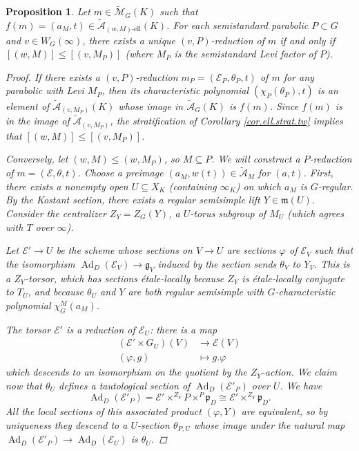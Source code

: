 \documentclass[openany]{amsbook}
\newtheorem{proposition}[theorem]{Proposition}
\theoremstyle{definition}
\theoremstyle{remark}
\numberwithin{equation}{section}
\newcommand{\cA}{\mathcal{A}}
\newcommand{\cM}{\mathcal{M}}
\newcommand{\cE}{\mathcal{E}}
\renewcommand{\phi}{\varphi}
\renewcommand{\-}{\operatorname{-}}
\newcommand{\on}[1]{\operatorname{#1}}
\newcommand{\fm}{\mathfrak{m}}
\newcommand{\el}{\text{-ell}}
\newcommand{\ctM}{\widetilde{\cM}}
\newcommand{\ctA}{\widetilde{\cA}}
\newcommand{\ctAt}[2]{\ctA_{(#1,#2)}}
\newcommand{\ctAe}[2]{\ctA_{(#1, #2)\el}}
\newcommand{\fp}{\mathfrak{p}}
\renewcommand{\fm}{\mathfrak{m}}
\renewcommand{\fg}{\mathfrak{g}}
\begin{document}
\begin{proposition}\label{prop.base.detects.p.reds}
    Let $m \in \ctM_G(K)$ such that $f(m) = (a_M, t) \in \ctAe{w}{M}(K)$. For each semistandard parabolic $P \subset G$ and $v \in W_G(\infty)$, there exists a unique $(v,P)$-reduction of $m$ if and only if $[(w,M)] \le [(v, M_P)]$ (where $M_P$ is the semistandard Levi factor of $P$).
    \begin{proof}
        If there exists a $(v,P)$-reduction $m_P = (\cE_P, \theta_P, t)$ of $m$ for any parabolic with Levi $M_P$, then its characteristic polynomial $(\chi_P(\theta_P), t)$ is an element of $\ctAt{v}{M_P}(K)$ whose image in $\ctA_{G}(K)$ is $f(m)$. Since $f(m)$ is in the image of $\ctAt{v}{M_P}$, the stratification of Corollary \ref{cor.ell.strat.tw} implies that $[(w, M)] \le [(v, M_P)]$.

        Conversely, let $(w,M) \le (w, M_P)$, so $M \subseteq P$. We will construct a $P$-reduction of $m = (\cE, \theta, t)$. Choose a preimage $(a_M, w(t)) \in \ctA_M$ for $(a,t)$. First, there exists a nonempty open $U \subseteq X_K$ (containing $\infty_K$) on which $a_M$ is $G$-regular. By the Kostant section, there exists a regular semisimple lift $Y \in \fm(U)$. Consider the centralizer $Z_Y = Z_G(Y)$, a $U$-torus subgroup of $M_U$ (which agrees with $T$ over $\infty$). 
        
        Let $\cE' \to U$ be the scheme whose sections on $V \to U$ are sections $\phi$ of $\cE_V$ such that the isomorphism $\on{Ad}_D(\cE_V) \to \fg_V$ induced by the section sends $\theta_V$ to $Y_V$. This is a $Z_Y$-torsor, which has sections \'etale-locally because $Z_Y$ is \'etale-locally conjugate to $T_U$, and because $\theta_U$ and $Y$ are both regular semisimple with $G$-characteristic polynomial $\chi_G^M(a_M)$.
        
        The torsor $\cE'$ is a reduction of $\cE_U$: there is a map
        \begin{align*}
            (\cE' \times G_U)(V) &\to \cE(V) \\
            (\phi, g) &\mapsto g.\phi
        \end{align*}
        which descends to an isomorphism on the quotient by the $Z_Y$-action. We claim now that $\theta_U$ defines a tautological section of $\on{Ad}_D(\cE'_P)$ over $U$. We have
        $$
            \on{Ad}_D(\cE'_P) = \cE' \times^{Z_Y} P \times^P \fp_D \cong \cE' \times^{Z_Y} \fp_D.
        $$
        All the local sections of this associated product $(\phi, Y)$ are equivalent, so by uniqueness they descend to a $U$-section $\theta_{P, U}$ whose image under the natural map $\on{Ad}_D(\cE'_P) \to \on{Ad}_D(\cE_U)$ is $\theta_U$. 


\end{proof}
\end{proposition}
\end{document}
